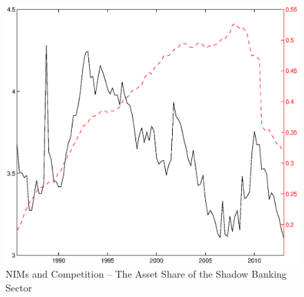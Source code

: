 \documentclass[11pt]{article}
\begin{document}
\clearpage
\begin{figure}

\caption{NIMs and Competition -- The Asset Share of the Shadow Banking Sector} \label{figure_nims_competition}
\center
\noindent
\hspace{-1.5cm}\includegraphics[scale=0.8]{figure_nims_competition.ps}
\end{figure}
\end{document}
